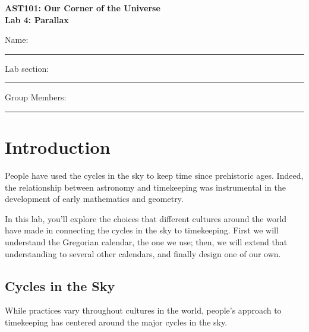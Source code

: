 \documentclass[11pt]{article}
\begin{document}
\begin{center}
\textbf{\Large
AST101: Our Corner of the Universe \\
\vspace*{0.1cm}
Lab 4: Parallax
}
\end{center}

\vspace*{0.5cm}

{\Large Name:}\vspace*{0.5cm}\\\hrule
{\Large Lab section:}\vspace*{0.5cm}\\\hrule
{\Large Group Members:}\vspace*{0.5cm}\\\hrule
\vspace*{0.5cm}

\section{Introduction}

People have used the cycles in the sky to keep time since prehistoric ages. Indeed, the relationship between astronomy and timekeeping was instrumental in the development of early mathematics and geometry.

In this lab, you'll explore the choices that different cultures around the world have made in connecting the cycles in the sky to timekeeping. First we will understand the Gregorian calendar, the one we use; then, we will extend that understanding to several other calendars, and finally design one of our own.

\subsection{Cycles in the Sky}

While practices vary throughout cultures in the world, people's approach to timekeeping has centered around the major cycles in the sky.
\end{document}

